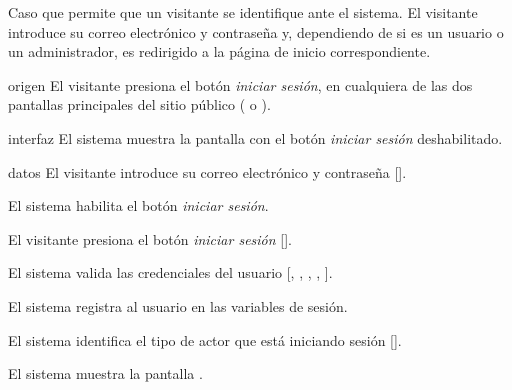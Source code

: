 %
%

{
  Caso que permite que un visitante se identifique ante el sistema. El
  visitante introduce su correo electrónico y contraseña y, dependiendo de
  si es un usuario o un administrador, es redirigido a la página de
  inicio correspondiente.

  \begin{trayectoriaPrincipal}

    \item[origen] El visitante presiona el botón \textit{iniciar sesión}, en
      cualquiera de las dos pantallas principales del sitio público
      ( o ).

    \item[interfaz] El sistema muestra la pantalla
       con el botón \textit{iniciar sesión}
      deshabilitado.

    \item[datos] El visitante introduce su correo electrónico y contraseña
      [].

    \item El sistema habilita el botón \textit{iniciar sesión}.

    \item El visitante presiona el botón \textit{iniciar sesión}
      [].

    \item El sistema valida las credenciales del usuario
      [,
      ,
      ,
      ,
      ].

    \item El sistema registra al usuario en las variables de sesión.

    \item El sistema identifica el tipo de actor que está iniciando
      sesión [].

    \item El sistema muestra la pantalla
      .

  \end{trayectoriaPrincipal}

}
